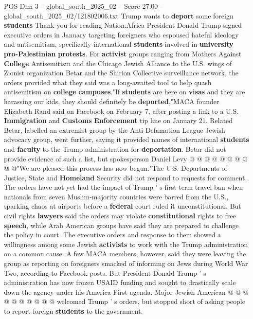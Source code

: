 \begin{textsample}{POS Dim 3 – global\_south\_2025\_02 – Score 27.00 – global\_south\_2025\_02/121802006.txt}  \label{ex:f3_pos_438}
Trump wants to \textbf{deport} some foreign \textbf{students} Thank you for reading Nation.Africa President Donald Trump signed executive orders in January targeting foreigners who espoused hateful ideology and antisemitism, specifically international \textbf{students} involved in \textbf{university} \textbf{pro-Palestinian} \textbf{protests}.
For \textbf{activist} groups ranging from Mothers Against \textbf{College} Antisemitism and the Chicago Jewish Alliance to the U.S. wings of Zionist organization Betar and the Shirion Collective surveillance network, the orders provided what they said was a long-awaited tool to help quash antisemitism on \textbf{college} \textbf{campuses}."If \textbf{students} are here on \textbf{visas} and they are harassing our kids, they should definitely be \textbf{deported},"MACA founder Elizabeth Rand said on Facebook on February 7, after posting a link to a U.S. \textbf{Immigration} and \textbf{Customs} \textbf{Enforcement} tip line on January 21.
Related Betar, labelled an extremist group by the Anti-Defamation League Jewish advocacy group, went further, saying it provided names of international \textbf{students} and \textbf{faculty} to the Trump administration for \textbf{deportation}.
Betar did not provide evidence of such a list, but spokesperson Daniel Levy @ @ @ @ @ @ @ @ @ @"We are pleased this process has now begun."The U.S.
Departments of Justice, State and \textbf{Homeland} Security did not respond to requests for comment.
The orders have not yet had the impact of Trump ' s first-term travel ban when nationals from seven Muslim-majority countries were barred from the U.S., sparking chaos at airports before a \textbf{federal} court ruled it unconstitutional.
But civil rights \textbf{lawyers} said the orders may violate \textbf{constitutional} rights to free \textbf{speech}, while Arab American groups have said they are prepared to challenge the policy in court.
The executive orders and response to them showed a willingness among some Jewish \textbf{activists} to work with the Trump administration on a common cause.
A few MACA members, however, said they were leaving the group as reporting on foreigners smacked of informing on Jews during World War Two, according to Facebook posts.
But President Donald Trump ' s administration has now frozen USAID funding and sought to drastically scale down the agency under his America First agenda.
Major Jewish American @ @ @ @ @ @ @ @ @ @ welcomed Trump ' s orders, but stopped short of asking people to report foreign \textbf{students} to the government.

\end{textsample}
